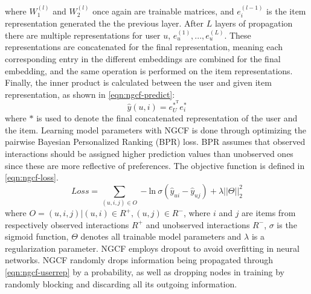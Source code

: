 where $W_1^{(l)}$ and $W_2^{(l)}$ once again are trainable matrices, and $e_i^{(l-1)}$ is the item representation generated the the previous layer.
After $L$ layers of propagation there are multiple representations for user $u$, ${e_u^{(1)},...,e_u^{(L)}}$. These representations are concatenated for the final representation, meaning each corresponding entry in the different embeddings are combined for the final embedding, and the same operation is performed on the item representations.
Finally, the inner product is calculated between the user and given item representation, as shown in \autoref{eqn:ngcf-predict}:
\begin{equation}\label{eqn:ngcf-predict}
  \hat{y}(u, i) = e_U^{*^\textrm{T}} e_i^*
\end{equation}
where $*$ is used to denote the final concatenated representation of the user and the item.
Learning model parameters with NGCF is done through optimizing the pairwise Bayesian Personalized Ranking (BPR) loss.
BPR assumes that observed interactions should be assigned higher prediction values than unobserved ones since these are more reflective of preferences.
The objective function is defined in \autoref{eqn:ngcf-loss}.
\begin{equation}\label{eqn:ngcf-loss}
    Loss = \sum_{(u, i, j) \in O} - \textrm{ln} \: \sigma (\hat{y}_{ui} - \hat{y}_{uj}) + \lambda ||\Theta||_2^2
\end{equation}
where $O = {(u, i, j) | (u, i) \in R^+, (u, j) \in R^-}$, where $i$ and $j$ are items from respectively observed interactions $R^+$ and unobserved interactions $R^-$, $\sigma$ is the sigmoid function, $\Theta$ denotes all trainable model parameters and $\lambda$ is a regularization parameter.
NGCF employs dropout to avoid overfitting in neural networks.
NGCF randomly drops information being propagated through \autoref{eqn:ngcf-userrep} by a probability, as well as dropping nodes in training by randomly blocking and discarding all its outgoing information.
